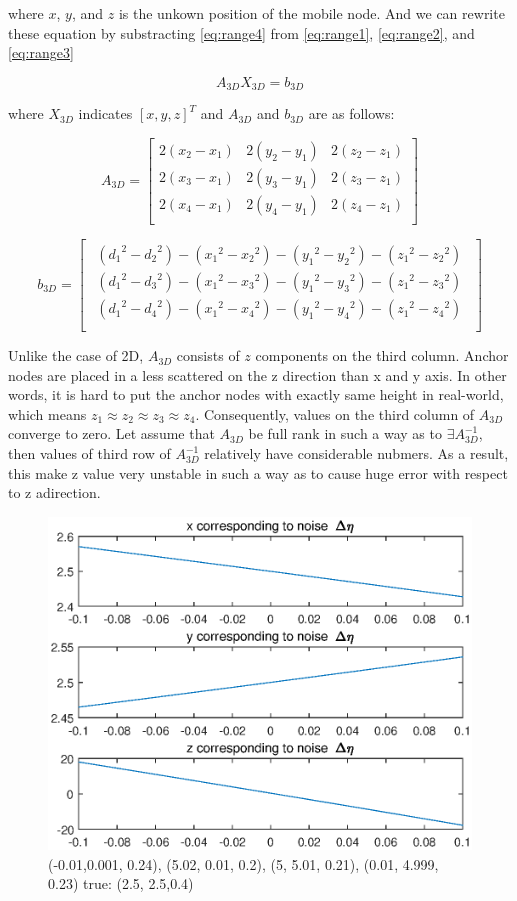 \documentclass{ieeeaccess}
\begin{document}
where $x$, $y$, and $z$ is the unkown position of the mobile node. And we can rewrite these equation by substracting \eqref{eq:range4} from \eqref{eq:range1}, \eqref{eq:range2}, and \eqref{eq:range3} 

\begin{equation}
A_{3D}X_{3D}=b_{3D}
\end{equation}

where $X_{3D}$ indicates $[x,y,z]^T$ and $A_{3D}$ and $b_{3D}$ are as follows: 

\begin{equation}
A_{3D} =\left[ {\begin{array}{ccc}
	2(x_2-x_1) & 2(y_2-y_1) & 2(z_2-z_1)\\
	2(x_3-x_1) & 2(y_3-y_1) & 2(z_3-z_1)\\
	2(x_4-x_1) & 2(y_4-y_1) & 2(z_4-z_1)\\
	\end{array} } \right]
\end{equation}

\begin{equation}
b_{3D} = \left[ {\begin{array}{c}
	\substack{
		({d_1}^2-{d_2}^2)-({x_1}^2-{x_2}^2)-({y_1}^2-{y_2}^2)-({z_1}^2-{z_2}^2)\\
		({d_1}^2-{d_3}^2)-({x_1}^2-{x_3}^2)-({y_1}^2-{y_3}^2)-({z_1}^2-{z_3}^2)\\
		({d_1}^2-{d_4}^2)-({x_1}^2-{x_4}^2)-({y_1}^2-{y_4}^2)-({z_1}^2-{z_4}^2)\\
	}
	\end{array} } \right]
\end{equation}

Unlike the case of 2D, $A_{3D}$ consists of $z$ components on the third column. Anchor nodes are placed in a less scattered on the z direction than x and y axis. In other words, it is hard to put the anchor nodes with exactly same height in real-world, which means $z_1\approx z_2\approx z_3\approx z_4$. Consequently, values on the third column of $A_{3D}$ converge to zero. Let assume that $A_{3D}$ be full rank in such a way as to $\exists A_{3D}^{-1}$, then values of third row of $A_{3D}^{-1}$ relatively have considerable nubmers. As a result, this make z value very unstable in such a way as to cause huge error with respect to z adirection. 


\begin{figure}[h]
	\centering
	\includegraphics[width=.5\textwidth]{image/noises}
	\caption{(-0.01,0.001, 0.24), (5.02, 0.01, 0.2), (5, 5.01, 0.21), (0.01, 4.999, 0.23) true: (2.5, 2.5,0.4)}
	\label{fig:noise}
\end{figure}
\end{document}
